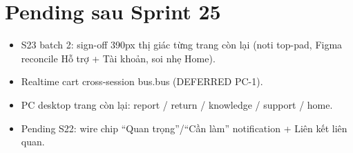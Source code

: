 \section{Pending sau Sprint 25}

\begin{itemize}
  \item S23 batch 2: sign-off 390px thị giác từng trang còn lại (noti top-pad, Figma reconcile Hỗ trợ + Tài khoản, soi nhẹ Home).
  \item Realtime cart cross-session bus.bus (DEFERRED PC-1).
  \item PC desktop trang còn lại: report / return / knowledge / support / home.
  \item Pending S22: wire chip ``Quan trọng''/``Cần làm'' notification + Liên kết liên quan.
\end{itemize}

